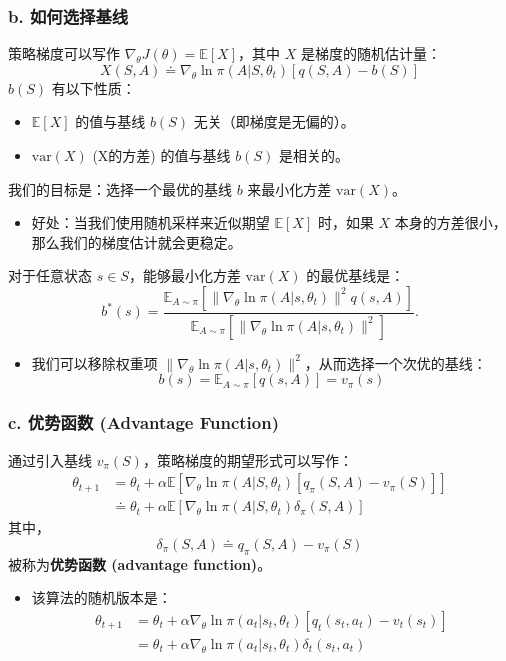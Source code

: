 \documentclass{article}
\begin{document}
\subsubsection*{b. 如何选择基线}
策略梯度可以写作 $\nabla_{\theta} J(\theta) = \mathbb{E}[X]$，其中 $X$ 是梯度的随机估计量：
\[
X(S, A) \doteq \nabla_{\theta} \ln \pi(A|S, \theta_t) [q(S, A) - b(S)]
\]
$b(S)$ 有以下性质：
\begin{itemize}
    \item $\mathbb{E}[X]$ 的值与基线 $b(S)$ 无关（即梯度是无偏的）。
    \item $\text{var}(X)$ (X的方差) 的值与基线 $b(S)$ 是相关的。
\end{itemize}
我们的目标是：选择一个最优的基线 $b$ 来最小化方差 $\text{var}(X)$。
\begin{itemize}
    \item 好处：当我们使用随机采样来近似期望 $\mathbb{E}[X]$ 时，如果 $X$ 本身的方差很小，那么我们的梯度估计就会更稳定。
\end{itemize}

对于任意状态 $s \in S$，能够最小化方差 $\text{var}(X)$ 的最优基线是：
\[
b^*(s) = \frac{\mathbb{E}_{A \sim \pi}\left[\|\nabla_{\theta} \ln \pi(A|s, \theta_t)\|^2 q(s, A)\right]}{\mathbb{E}_{A \sim \pi}\left[\|\nabla_{\theta} \ln \pi(A|s, \theta_t)\|^2\right]}.
\]
\begin{itemize}
    \item 我们可以移除权重项 $\|\nabla_{\theta} \ln \pi(A|s, \theta_t)\|^2$，从而选择一个次优的基线：
    \[
    b(s) = \mathbb{E}_{A \sim \pi}[q(s, A)] = v_{\pi}(s)
    \]
\end{itemize}
\subsubsection*{c. 优势函数 (Advantage Function)}
通过引入基线 $v_{\pi}(S)$，策略梯度的期望形式可以写作：
\begin{align*}
    \theta_{t+1} &= \theta_t + \alpha \mathbb{E}[\nabla_{\theta} \ln \pi(A|S, \theta_t)[q_{\pi}(S, A) - v_{\pi}(S)]] \\
    &\doteq \theta_t + \alpha \mathbb{E}[\nabla_{\theta} \ln \pi(A|S, \theta_t)\delta_{\pi}(S, A)]
\end{align*}
其中，
\[
\delta_{\pi}(S, A) \doteq q_{\pi}(S, A) - v_{\pi}(S)
\]
被称为\textbf{优势函数 (advantage function)}。

\begin{itemize}
    \item 该算法的随机版本是：
    \begin{align*}
        \theta_{t+1} &= \theta_t + \alpha \nabla_{\theta} \ln \pi(a_t|s_t, \theta_t)[q_t(s_t, a_t) - v_t(s_t)] \\
        &= \theta_t + \alpha \nabla_{\theta} \ln \pi(a_t|s_t, \theta_t)\delta_t(s_t, a_t)
    \end{align*}
\end{itemize}
\end{document}
